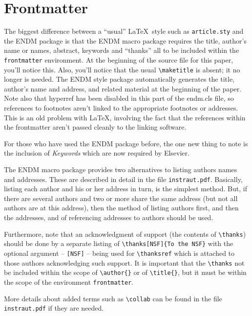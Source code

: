 \documentclass{endm}
\begin{document}
\section{Frontmatter}

The biggest difference between a ``usual'' \LaTeX\ style such as
\texttt{article.sty} and the ENDM package is that the ENDM macro
package requires the title, author's name or names, abstract, keywords
and ``thanks'' all to be included within the \texttt{frontmatter}
environment. At the beginning of the source file for this paper, you'll
notice this. Also, you'll notice that the usual \verb+\maketitle+ is
absent; it no longer is needed. The ENDM style package automatically
generates the title, author's name and address, and related material at
the beginning of the paper. Note also that hyperref has been disabled in
this part of the endm.cls file, so references to footnotes aren't linked
to the appropriate footnotes or addresses. This is an old problem with
\LaTeX, involving the fact that the references within the frontmatter
aren't passed cleanly to the linking software.

For those who have used the ENDM package before, the one new thing to
note is the inclusion of \emph{Keywords} which are now required by
Elsevier.

The ENDM macro package provides two alternatives to listing authors
names and addresses. These are described in detail in the file
\texttt{instraut.pdf}. Basically, listing each author and his or her
address in turn, is the simplest method. But, if there are several
authors and two or more share the same address (but not all authors
are at this address), then the method of listing authors first, and
then the addresses, and of referencing addresses to authors should be
used.

Furthermore, note that an acknowledgment of support (the contents of
\verb+\thanks+) should be done by a separate listing of
\verb+\thanks[NSF]{To the NSF}+ with the optional argument --
\verb+[NSF]+ -- being used for \verb+\thanksref+ which is attached to
those authors acknowledging such support. It is important that the
\verb+\thanks+ not be included within the scope of \verb+\author{}+ or
of \verb+\title{}+, but it must be within the scope of the environment
\texttt{frontmatter}.

More details about added terms such as \verb+\collab+ can be found in
the file \texttt{instraut.pdf} if they are needed.
\end{document}
